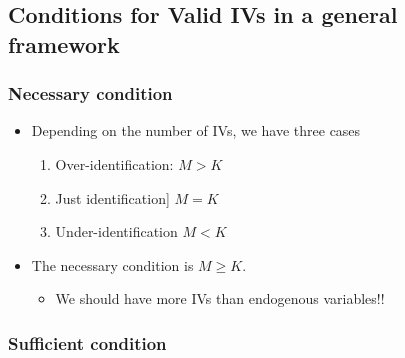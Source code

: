 \documentclass[]{book}
\providecommand{\tightlist}{%
  \setlength{\itemsep}{0pt}\setlength{\parskip}{0pt}}
\begin{document}
\subsection{Conditions for Valid IVs in a general
framework}\label{conditions-for-valid-ivs-in-a-general-framework}

\subsubsection{Necessary condition}\label{necessary-condition}

\begin{itemize}
\tightlist
\item
  Depending on the number of IVs, we have three cases

  \begin{enumerate}
  \def\labelenumi{\arabic{enumi}.}
  \tightlist
  \item
    Over-identification: \(M > K\)
  \item
    Just identification{]} \(M=K\)
  \item
    Under-identification \(M < K\)
  \end{enumerate}
\item
  The necessary condition is \(M \geq K\).

  \begin{itemize}
  \tightlist
  \item
    We should have more IVs than endogenous variables!!
  \end{itemize}
\end{itemize}

\subsubsection{Sufficient condition}\label{sufficient-condition}
\end{document}
